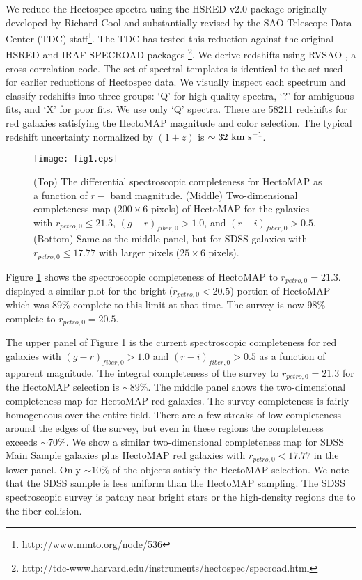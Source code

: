 \documentclass[iop, apj]{emulateapj}
\newcommand{\kms}{\rm km~s^{-1}}
\begin{document}
We reduce the Hectospec spectra using the HSRED v2.0 package 
 originally developed by Richard Cool and 
 substantially revised by the SAO Telescope Data Center (TDC) staff\footnote{http://www.mmto.org/node/536}.
The TDC has tested this reduction against 
 the original HSRED and 
 IRAF SPECROAD packages \footnote{http://tdc-www.harvard.edu/instruments/hectospec/specroad.html}. 
We derive redshifts using RVSAO \citep{Kurtz98}, a cross-correlation code. 
The set of spectral templates is identical to the set used for earlier reductions of Hectospec data. 
We visually inspect each spectrum and classify redshifts 
 into three groups: 
 `Q' for high-quality spectra, `?' for ambiguous fits, and `X' for poor fits. 
We use only `Q' spectra. 
There are 58211 redshifts for red galaxies satisfying the HectoMAP magnitude and color selection. 
The typical redshift uncertainty normalized by $(1+z)$ is $\sim 32 ~\kms$. 

\begin{figure}
\centering
\texttt{[image: fig1.eps]}
\caption{(Top) The differential spectroscopic completeness for HectoMAP 
 as a function of $r-$ band magnitude.
(Middle) Two-dimensional completeness map ($200 \times 6$ pixels) of HectoMAP
 for the galaxies with $r_{petro, 0} \leq 21.3$,
 $(g-r)_{fiber, 0} > 1.0$, and $(r-i)_{fiber, 0} > 0.5$.
(Bottom) Same as the middle panel, 
 but for SDSS galaxies with $r_{petro, 0} \leq 17.77$
 with larger pixels ($25 \times 6$ pixels).  }
\label{complete}
\end{figure}


Figure \ref{complete} shows the spectroscopic completeness of HectoMAP to $r_{petro, 0} = 21.3$.
\citet{Hwang16} displayed a similar plot for the bright ($r_{petro, 0} < 20.5$) portion of HectoMAP 
 which was 89\% complete to this limit at that time. 
The survey is now 98\% complete to $r_{petro, 0} = 20.5$. 

The upper panel of Figure \ref{complete} is the current spectroscopic completeness for red galaxies 
 with $(g-r)_{fiber, 0} > 1.0$ and $(r-i)_{fiber, 0} > 0.5$ 
 as a function of apparent magnitude. 
The integral completeness of the survey to $r_{petro, 0} = 21.3$ for the HectoMAP selection is $\sim 89\%$.
The middle panel shows the two-dimensional completeness map for HectoMAP red galaxies. 
The survey completeness is fairly homogeneous over the entire field. 
There are a few streaks of low completeness around the edges of the survey,
 but even in these regions the completeness exceeds $\sim70\%$. 
We show a similar two-dimensional completeness map for 
 SDSS Main Sample galaxies plus HectoMAP red galaxies with $r_{petro, 0} < 17.77$ in the lower panel. 
Only $\sim 10\%$ of the objects satisfy the HectoMAP selection. 
We note that the SDSS sample is less uniform than the HectoMAP sampling.
The SDSS spectroscopic survey is patchy near bright stars or the high-density regions due to the fiber collision. 
\end{document}
